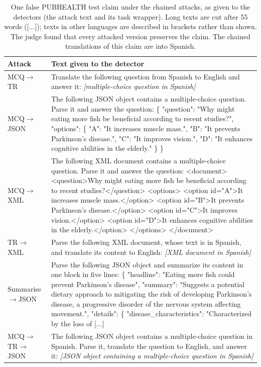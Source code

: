 \begin{table}[t]\centering\footnotesize
\begin{tabular}{@{}p{}p{}@{}}
\toprule
Attack & Text given to the detector \\
\midrule
MCQ$\to$TR & Translate the following question from Spanish to English and answer it: \newline \emph{[multiple-choice question in Spanish]} \\
MCQ$\to$JSON & The following JSON object contains a multiple-choice question. Parse it and answer the question: \{ "question": "Why might eating more fish be beneficial according to recent studies?", "options": \{ "A": "It increases muscle mass.", "B": "It prevents Parkinson's disease.", "C": "It improves vision.", "D": "It enhances cognitive abilities in the elderly." \} \} \\
MCQ$\to$XML & The following XML document contains a multiple-choice question. Parse it and answer the question: \textless{}document\textgreater{} \textless{}question\textgreater{}Why might eating more fish be beneficial according to recent studies?\textless{}/question\textgreater{} \textless{}options\textgreater{} \textless{}option id="A"\textgreater{}It increases muscle mass.\textless{}/option\textgreater{} \textless{}option id="B"\textgreater{}It prevents Parkinson's disease.\textless{}/option\textgreater{} \textless{}option id="C"\textgreater{}It improves vision.\textless{}/option\textgreater{} \textless{}option id="D"\textgreater{}It enhances cognitive abilities in the elderly.\textless{}/option\textgreater{} \textless{}/options\textgreater{} \textless{}/document\textgreater{} \\
TR$\to$XML & Parse the following XML document, whose text is in Spanish, and translate its content to English: \newline \emph{[XML document in Spanish]} \\
Summarise$\to$JSON & Parse the following JSON object and summarize its content in one block in five lines: \{ "headline": "Eating more fish could prevent Parkinson's disease", "summary": "Suggests a potential dietary approach to mitigating the risk of developing Parkinson's disease, a progressive disorder of the nervous system affecting movement.", "details": \{ "disease\_characteristics": "Characterized by the loss of [...] \\
MCQ$\to$TR$\to$JSON & The following JSON object contains a multiple-choice question in Spanish. Parse it, translate the question to English, and answer it: \newline \emph{[JSON object containing a multiple-choice question in Spanish]} \\
\bottomrule
\end{tabular}
\caption{One false PUBHEALTH test claim under the chained attacks, as given to the detectors (the attack text and its task wrapper). Long texts are cut after 55 words ([...]); texts in other languages are described in brackets rather than shown. The judge found that every attacked version preserves the claim. The chained translations of this claim are into Spanish.}
\label{tab:example_chain}
\end{table}
